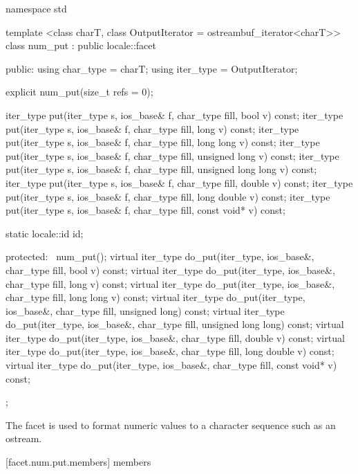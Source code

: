 %
\begin{codeblock}
namespace std {
  template <class charT, class OutputIterator = ostreambuf_iterator<charT>>
  class num_put : public locale::facet {
  public:
    using char_type = charT;
    using iter_type = OutputIterator;

    explicit num_put(size_t refs = 0);

    iter_type put(iter_type s, ios_base& f, char_type fill, bool v) const;
    iter_type put(iter_type s, ios_base& f, char_type fill, long v) const;
    iter_type put(iter_type s, ios_base& f, char_type fill, long long v) const;
    iter_type put(iter_type s, ios_base& f, char_type fill,
                  unsigned long v) const;
    iter_type put(iter_type s, ios_base& f, char_type fill,
                  unsigned long long v) const;
    iter_type put(iter_type s, ios_base& f, char_type fill,
                  double v) const;
    iter_type put(iter_type s, ios_base& f, char_type fill,
                  long double v) const;
    iter_type put(iter_type s, ios_base& f, char_type fill,
                  const void* v) const;

    static locale::id id;

  protected:
    ~num_put();
    virtual iter_type do_put(iter_type, ios_base&, char_type fill,
                             bool v) const;
    virtual iter_type do_put(iter_type, ios_base&, char_type fill,
                             long v) const;
    virtual iter_type do_put(iter_type, ios_base&, char_type fill,
                             long long v) const;
    virtual iter_type do_put(iter_type, ios_base&, char_type fill,
                             unsigned long) const;
    virtual iter_type do_put(iter_type, ios_base&, char_type fill,
                             unsigned long long) const;
    virtual iter_type do_put(iter_type, ios_base&, char_type fill,
                             double v) const;
    virtual iter_type do_put(iter_type, ios_base&, char_type fill,
                             long double v) const;
    virtual iter_type do_put(iter_type, ios_base&, char_type fill,
                             const void* v) const;
  };
}
\end{codeblock}

\pnum
The facet
is used to format numeric values to a character sequence such as an ostream.

[facet.num.put.members]{ members}

